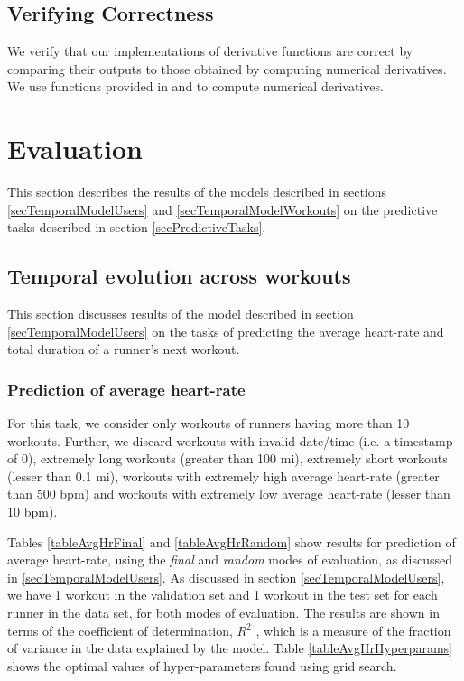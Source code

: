 \documentclass{acm_proc_article-sp}
\begin{document}
\subsection{Verifying Correctness}

We verify that our implementations of derivative functions are correct by comparing their outputs to those obtained by computing numerical derivatives. We use functions provided in \cite{scipy} and \cite{dlib} to compute numerical derivatives.

\section{Evaluation}
\label{secEvaluation}
This section describes the results of the models described in sections \ref{secTemporalModelUsers} and \ref{secTemporalModelWorkouts} on the predictive tasks described in section \ref{secPredictiveTasks}. 

\subsection{Temporal evolution across workouts}
This section discusses results of the model described in section \ref{secTemporalModelUsers} on the tasks of predicting the average heart-rate and total duration of a runner's next workout.

\subsubsection{Prediction of average heart-rate}

For this task, we consider only workouts of runners having more than 10 workouts. Further, we discard workouts with invalid date/time (i.e. a timestamp of 0), extremely long workouts (greater than 100 mi), extremely short workouts (lesser than 0.1 mi), workouts with extremely high average heart-rate (greater than 500 bpm) and workouts with extremely low average heart-rate (lesser than 10 bpm).

Tables \ref{tableAvgHrFinal} and \ref{tableAvgHrRandom} show results for prediction of average heart-rate, using the  \emph{final} and \emph{random} modes of evaluation, as discussed in \ref{secTemporalModelUsers}. As discussed in section \ref{secTemporalModelUsers}, we have 1 workout in the validation set and 1 workout in the test set for each runner in the data set, for both modes of evaluation. The results are shown in terms of the coefficient of determination, $R^2$ \cite{r2Wiki}, which is a measure of the fraction of variance in the data explained by the model. Table \ref{tableAvgHrHyperparams} shows the optimal values of hyper-parameters found using grid search.
\end{document}
